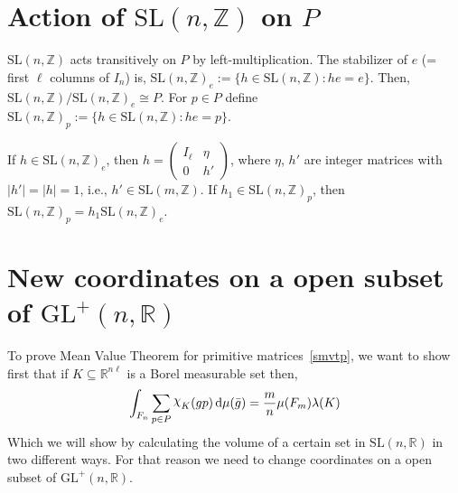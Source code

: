 \documentclass[11pt]{article}
\theoremstyle{definition}
\newcommand{\mychi}{\raisebox{2pt}{$\chi$}}
\begin{document}
\section{Action of $\mathrm{SL}(n, \mathbb{Z})$ on $P$}
$\mathrm{SL}(n, \mathbb{Z})$ acts transitively on $P$ by left-multiplication.
The stabilizer of $e$ (= first $\ell$ columns of $I_n $) is, ${\mathrm{SL}(n, \mathbb{Z})}_e := \{h \in \mathrm{SL}(n, \mathbb{Z}): he = e\}$.
Then, $\mathrm{SL}(n, \mathbb{Z}) / {\mathrm{SL}(n, \mathbb{Z})}_e \cong P $.
For $p \in P$ define ${\mathrm{SL}(n, \mathbb{Z})}_p := \{h \in \mathrm{SL}(n, \mathbb{Z}): he = p\}$.

If $h \in {\mathrm{SL}(n, \mathbb{Z})}_e$, then $h=
\begin{pmatrix}
    I_\ell & \eta   \\
    0      & h'
\end{pmatrix}
$, where $\eta$, $h'$ are integer matrices with $|h'|=|h|=1$, i.e., $h' \in \mathrm{SL}(m,\mathbb{Z})$.
If $h_1 \in {\mathrm{SL}(n, \mathbb{Z})}_p$, then ${\mathrm{SL}(n,\mathbb{Z})}_p = h_1 {\mathrm{SL}(n, \mathbb{Z})}_e$.

\section{New coordinates on a open subset of $\mathrm{GL}^+(n, \mathbb{R})$}\label{secn1.6}
To prove Mean Value Theorem for primitive matrices~\ref{smvtp}, we want to show first that if $K \subseteq \mathbb{R}^{n \ell }$ is a Borel measurable set then,
\[
    \int_{F_n} \displaystyle\sum_{p \in P} \mychi _K (gp) \, \mathrm{d} \mu  (\bar{g}) = \frac{m}{n} \mu (F_m) \lambda (K)
\]
Which we will show by calculating the volume of a certain set in $\mathrm{SL}(n,\mathbb{R}	)$ in two different ways.
For that reason we need to change coordinates on a open subset of $  \mathrm{GL}^+(n, \mathbb{R})$.
\end{document}
